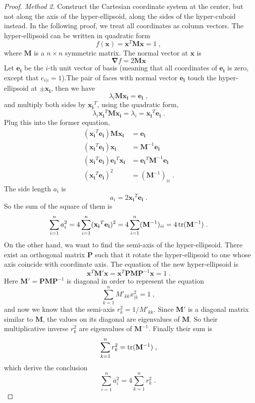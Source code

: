 \documentclass[10pt,a4paper]{article}
\begin{document}
	\begin{proof}[Proof. Method 2]
		Construct the Cartesian coordinate system at the center, but not along the axis of the hyper-ellipsoid, along the sides of the hyper-cuboid instead. In the following proof, we treat all coordinates as column vectors.
		The hyper-ellipsoid can be written in quadratic form
		\[
		f(\mathbf{x})=\mathbf{x}^T \mathbf{M} \mathbf{x}=1\;,
		\]
		where $\mathbf{M}$ is a $n\times n$ symmetric matrix. The normal vector at $\mathbf{x}$ is
		\[
		\mathbf{\nabla}f=2\mathbf{M}\mathbf{x}
		\]
		Let $\mathbf{e_i}$ be the $i$-th unit vector of basis (meaning that all coordinates of $\mathbf{e_i}$ is zero, except that $e_{i|i}=1$).The pair of faces with normal vector $\mathbf{e_i}$ touch the hyper-ellipsoid at $\pm \mathbf{x_i}$, then we have
		\[
		\lambda_i\mathbf{M}\mathbf{x_i}=\mathbf{e_i}\;,
		\]
		and multiply both sides by $\mathbf{x_i}^T$, using the quadratic form,
		\[
		\lambda_i\mathbf{x_i}^T\mathbf{M}\mathbf{x_i}=\lambda_i=\mathbf{x_i}^T\mathbf{e_i}\;.
		\]
		Plug this into the former equation,
		\begin{align*}
		(\mathbf{x_i}^T\mathbf{e_i})\mathbf{M}\mathbf{x_i}&=\mathbf{e_i}\\
		 (\mathbf{x_i}^T\mathbf{e_i})\mathbf{x_i}&=\mathbf{M}^{-1}\mathbf{e_i}\\
		 (\mathbf{x_i}^T\mathbf{e_i})\mathbf{e_i}^T\mathbf{x_i}&=\mathbf{e_i}^T\mathbf{M}^{-1}\mathbf{e_i}\\
		 (\mathbf{x_i}^T\mathbf{e_i})^2&=(\mathbf{M}^{-1})_{ii}\;.
		\end{align*}
		The side length $a_i$ is
		\[
		a_i=2\mathbf{x_i}^T\mathbf{e_i}\;.
		\]
		So the sum of the square of them is
		\[
		\sum_{i=1}^{n}a_i^2=4\sum_{i=1}^{n}(\mathbf{x_i}^T\mathbf{e_i})^2=4\sum_{i=1}^{n}(\mathbf{M}^{-1})_{ii}=4\operatorname{tr}(\mathbf{M}^{-1})\;.
		\]
		On the other hand, wa want to find the semi-axis of the hyper-ellipsoid. There exist an orthogonal matrix $\mathbf{P}$ such that it rotate the hyper-ellipsoid to one whose axis coincide with coordinate axis. The equation of the new hyper-ellipsoid is
		\[
		\mathbf{x}^T \mathbf{M'} \mathbf{x}=\mathbf{x}^T \mathbf{P} \mathbf{M} \mathbf{P}^{-1}\mathbf{x}=1\;.
		\]
		Here $\mathbf{M'}=\mathbf{P} \mathbf{M} \mathbf{P}^{-1}$ is diagonal in order to represent the equation
		\[
		\sum_{k=1}^{n} M'_{kk} x_{|k}^2=1\;,
		\]
		and now we know that the semi-axis $r_k^2=1/M'_{kk}$. Since $\mathbf{M'}$ is a diagonal matrix similar to $\mathbf{M}$, the values on its diagonal are eigenvalues of $\mathbf{M}$. So their multiplicative inverse $r_k^2$ are eigenvalues of $\mathbf{M}^{-1}$. Finally their sum is
		\[
		\sum_{k=1}^{n}r_k^2=\operatorname{tr}(\mathbf{M}^{-1})\;,
		\]
		which derive the conclusion
		\[
		\sum_{i=1}^{n}a_i^2=4\sum_{k=1}^{n}r_k^2\;.\
		\]
	\end{proof}
\end{document}
